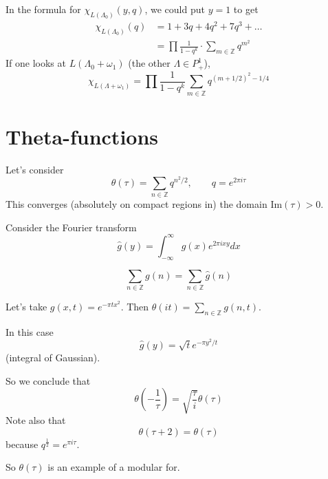 \begin{remark}
\label{remark-}
In the formula for $\chi_{L(\Lambda_0)}(y,q)$, 
we could put $y=1$ to get
\begin{align*}
\chi_{L(\Lambda_0)}(q)&=1+3q+4q^2+7q^3+\ldots\\
&=\prod\frac{1}{1-q^k}\cdot \sum_{m \in \mathbb{Z}}q^{m^2}
\end{align*}
If one looks at $L(\Lambda_0+\omega_1)$ (the other $\Lambda \in P_+^1$),
$$
\chi_{L(\Lambda+\omega_1)}=\prod \frac{1}{1-q^k}
\sum_{m \in \mathbb{Z}}q^{(m+1/2)^2-1/4}
$$
\end{remark}

\section{Theta-functions}
\label{section-theta-functions}

\noindent
Let's consider
$$
\theta(\tau)=\sum_{n \in \mathbb{Z}}q^{n^2/2},\qquad q=e^{2\pi i \tau}
$$
This converges (absolutely on compact regions in) 
the domain $\text{Im}(\tau)>0$.

Consider the Fourier transform
$$
\hat{g}(y)=\int_{-\infty}^\infty g(x)e^{2\pi ixy}dx
$$

\begin{theorem}
\label{theorem-Poisson-summation}
 $$
\sum_{n \in \mathbb{Z}}g(n)=\sum_{n \in \mathbb{Z}}\hat{g}(n)
$$
\end{theorem}

Let's take $g(x,t)=e^{-\pi tx^2}$.
Then $\theta(it)=\sum_{n\in \mathbb{Z}}g(n,t)$.

In this case
$$
\hat{g}(y)=\sqrt{t}e^{-\pi y^2/t}
$$
(integral of Gaussian).

So we conclude that
$$
\theta\left(-\frac{1}{\tau}\right)=\sqrt{\frac{\tau}{i}}\theta(\tau)
$$
Note also that
$$
\theta(\tau+2)=\theta(\tau)
$$
because $q^{\frac{1}{2}}=e^{\pi i\tau}$.

So $\theta(\tau)$ is an example of a modular for.

